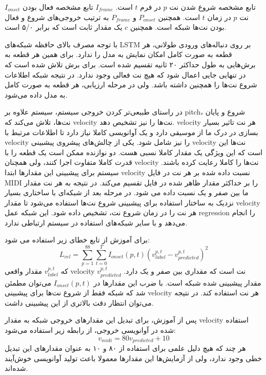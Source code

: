 $I_{onset}$ تابع مشخصه شروع شدن نت $p$ در فرم $t$ است. $I_{frame}$ تابع مشخصه
فعال بودن نت $p$ در زمان $t$ است. همچنین $P_{onset}$ و $P_{frame}$ به ترتیب
خروجی‌های شروع و فعال بودن نت‌ها شبکه است. همچنین $c$ یک مقدار ثابت است که برابر
۵/۰ است.

با توجه مصرف بالای حافظه شبکه‌های \gls{LSTM} بر روی دنباله‌های ورودی طولانی، هر
قطعه به صورت کامل امکان نمایش به مدل را ندارد. برای همین هر قطعه به برش‌هایی به
طول حداکثر ۲۰ ثانیه تقسیم شده است. برای برش تلاش شده است که در تنهایی جایی اعمال
شود که هیچ نت فعالی وجود ندارد. در نتیجه شبکه اطلاعات شروع نت‌ها را همچنین داشته
باشد. ولی در مرحله ارزیابی، هر قطعه به صورت کامل به مدل داده می‌شود.

در راستای طبیعی‌تر کردن خروجی سیستم، سیستم علاوه بر \gls{pitch}، شروع و پایان
نت‌ها، تلاش می‌کند که \gls{velocity} نت‌ها را نیز تشخیص دهد. \gls{velocity} هر
نت تاثیر بسیار بسازی در درک ما از موسیقی دارد و یک آوانویسی کاملا نیاز دارد تا
اطلاعات مرتبط با \gls{velocity} را نیز شامل شود. یکی از چالش‌های پیشروی پیشبینی
\gls{velocity} نت‌ها این است که این ویژگی یک مقدار کاملا نسبی هست. دو نوازنده
ممکن است یک قطعه را با قدرت کاملا متفاوت اجرا کنند، ولی همچنان \gls{velocity}
نت‌ها را کاملا رعایت کرده باشند. سیستم برای پیشبینی این مقدارها ابتدا
\gls{velocity} نسبت داده شده بر هر نت در فایل \gls{MIDI} را بر حداکثر مقدار ظاهر
شده در فایل تقسیم می‌کند. در نتیجه به هر نت مقدار ما بین صفر و یک نسبت داده می
شود. در مرحله بعد از شبکه‌ای با ساختاری بسیار نزدیک به ساختار استفاده برای
پیشبینی شروع نت‌ها استفاده می‌شود تا مقدار \gls{velocity} هر نت را در زمان شروع
نت، تشخیص داده شود. این شبکه عمل \gls{regression} را انجام می‌دهد و با سایر
شبکه‌های استفاده در سیستم ارتباطی ندارد.

برای آموزش از تابع خطای زیر استفاده می شود:
\begin{equation}
    L_{vel} = \sum_{p=1}^{88} \sum_{t=0}^{T} I_{onset}(p, t) (v_{label}^{p,t} - v_{predicted}^{p,t})^{2}
\end{equation}
که $v_{label}^{p, t}$ مقدار واقعی \gls{velocity} نت است که مقداری بین صفر و یک
دارد. $v_{predicted}^{p,t}$ مقدار پیشبینی شده شبکه است. با ضرب این مقدارها در
$I_{onset}(p, t)$ می‌توان مطمئن شد که شبکه فقط از شروع نت‌ها برای پیشبینی
\gls{velocity} هر نت استفاده کند. در نتیجه می‌توان انتظار دقت بالاتری از این پیشبینی داشت.

پس از آموزش، برای تبدیل این مقدارهای خروجی شبکه به مقدار \gls{velocity} استفاده
شده در آوانویسی خروجی، از رابطه زیر استفاده می‌شود:
\begin{equation}
    v_{midi} = 80 v_{predicted} + 10
\end{equation}
هر چند که هیچ دلیل علمی برای استفاده از ۸۰ و ۱۰ به عنوان مقدارهای این تبدیل خطی
وجود ندارد، ولی از آزمایش‌ها این مقدارها معمولا باعث تولید آوانویسی خوش‌آیند
شده‌اند.

